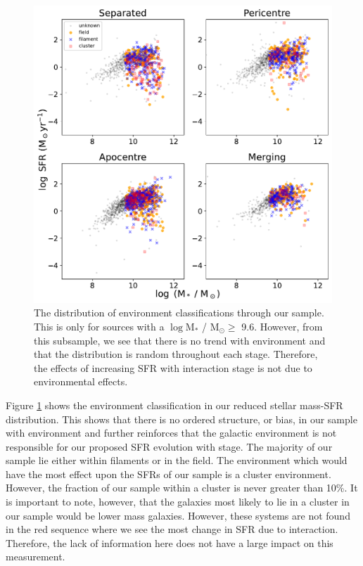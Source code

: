 \begin{figure}
    \centering
    \includegraphics[width=\textwidth]{Chapter3/figures/sfr-mass-density.pdf}
    \caption[The distribution of environment classifications through our sample.]{The distribution of environment classifications through our sample. This is only for sources with a $\log$M$_*$ / M$_\odot \geq$ 9.6. However, from this subsample, we see that there is no trend with environment and that the distribution is random throughout each stage. Therefore, the effects of increasing SFR with interaction stage is not due to environmental effects.}
    \label{fig:dens-sfr-mass}
\end{figure}

Figure \ref{fig:dens-sfr-mass} shows the environment classification in our reduced stellar mass-SFR distribution. This shows that there is no ordered structure, or bias, in our sample with environment and further reinforces that the galactic environment is not responsible for our proposed SFR evolution with stage. The majority of our sample lie either within filaments or in the field. The environment which would have the most effect upon the SFRs of our sample is a cluster environment. However, the fraction of our sample within a cluster is never greater than 10\%. It is important to note, however, that the galaxies most likely to lie in a cluster in our sample would be lower mass galaxies. However, these systems are not found in the red sequence where we see the most change in SFR due to interaction. Therefore, the lack of information here does not have a large impact on this measurement. 

